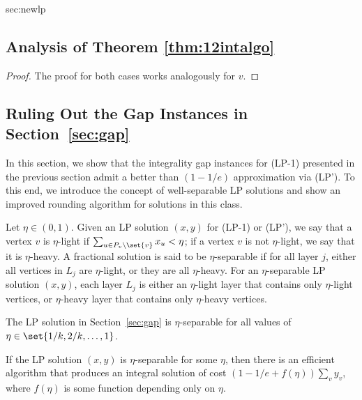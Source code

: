 \begin{appendixextra}{sec:newlp}{\subsection{Analysis of Theorem \ref{thm:12intalgo}}}
\begin{proof}
The proof for both cases works analogously for $v$.
\end{proof}

\end{appendixextra}

\subsection{Ruling Out the Gap Instances in Section~\ref{sec:gap}}  
\label{sec:well-separable}

In this section, we show that the integrality gap instances for (LP-1) presented in the previous section admit a better than $(1-1/e)$ approximation via (LP').
To this end, we introduce the concept of well-separable LP solutions  and show an improved rounding algorithm for solutions in this class.  


Let $\eta \in (0,1)$. 
Given an LP solution $(x,y)$ for (LP-1) or (LP'), we say that a vertex $v$ is $\eta$-light if $\sum_{u \in P_v \setminus \set{v}} x_u < \eta$; if a vertex $v$ is not $\eta$-light, we say that it is $\eta$-heavy. 
A fractional solution is said to be $\eta$-separable if for all layer $j$, either all vertices in $L_j$ are $\eta$-light, or they are all $\eta$-heavy.  
For an $\eta$-separable LP solution $(x,y)$, each layer $L_j$ is either an $\eta$-light layer that contains only $\eta$-light vertices, or $\eta$-heavy layer that contains only $\eta$-heavy vertices.

\begin{observation} 
The LP solution in Section~\ref{sec:gap} is $\eta$-separable for all values of $\eta \in \set{1/k, 2/k, \ldots, 1}$.  
\end{observation}   

\begin{theorem}
If the LP solution $(x,y)$ is $\eta$-separable for some $\eta$, then there is an efficient algorithm that produces an integral solution of cost $(1-1/e + f(\eta))\sum_{v} y_v$, where $f(\eta)$ is some function depending only on $\eta$.
\label{thm:wellseparable}
\end{theorem}  

\vspace{0.1in} 

